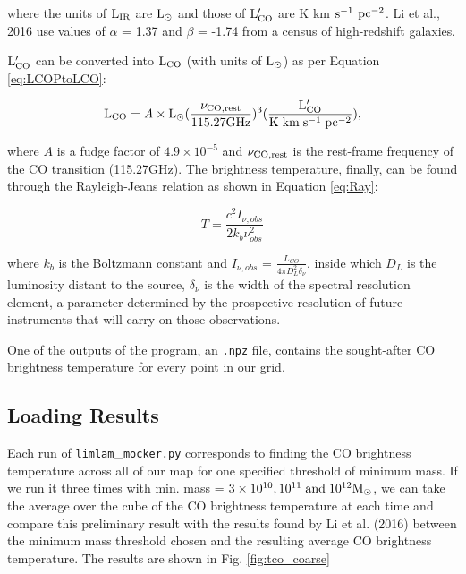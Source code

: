 \documentclass[apj]{emulateapj}
\begin{document}
where the units of $\rm{L_{IR}}$ are $\rm{L_\odot}$ and those of $\rm{L_{CO}'}$ are K km $\rm{s^{-1}}$ $\rm{pc^{-2}}$. Li et al., 2016 \cite{Li_2016} use values of $\alpha$ = 1.37 and $\beta$ = -1.74 from a census of high-redshift galaxies.

$\rm{L_{CO}'}$ can be converted into $\rm{L_{CO}}$ (with units of $\rm{L_\odot}$) as per Equation \ref{eq:LCOPtoLCO}:

\begin{equation}
    \rm{L_{CO}} = \textit{A} \times \rm{L_\odot} (\frac{\rm{\nu_{CO, rest}}}{115.27 GHz})^3 (\frac{\rm{L_{CO}'}}{K \hspace{1mm} km \hspace{1mm} s^{-1} \hspace{1mm} pc^{-2}}),
    \label{eq:LCOPtoLCO}
\end{equation}

where $A$ is a fudge factor of $4.9 \times 10^{-5}$ and $\rm{\nu_{CO, rest}}$ is the rest-frame frequency of the CO transition (115.27GHz). The brightness temperature, finally, can be found through the Rayleigh-Jeans relation as shown in Equation \ref{eq:Ray}:

\begin{equation}
    T = \frac{c^2 I_{\nu, obs}}{2k_b \nu_{obs}^2}
    \label{eq:Ray}
\end{equation}

where $k_b$ is the Boltzmann constant and $I_{\nu, obs}$ = $\frac{L_{CO}}{4\pi D_L^2 \delta_{\nu}}$, inside which $D_L$ is the luminosity distant to the source, $\delta_{\nu}$ is the width of the spectral resolution element, a parameter determined by the prospective resolution of future instruments that will carry on those observations.

One of the outputs of the program, an \texttt{.npz} file, contains the sought-after CO brightness temperature for every point in our grid.

\subsection{Loading Results}
Each run of \texttt{limlam}\_\texttt{mocker.py} corresponds to finding the CO brightness temperature across all of our map for one specified threshold of minimum mass. If we run it three times with min. mass = $3 \times 10^{10}, 10^{11} \hspace{1mm} \rm{and} \hspace{1mm} 10^{12} \rm{M_\odot}$, we can take the average over the cube of the CO brightness temperature at each time and compare this preliminary result with the results found by Li et al. (2016) \cite{Li_2016} between the minimum mass threshold chosen and the resulting average CO brightness temperature. The results are shown in Fig. \ref{fig:tco_coarse}
\end{document}
